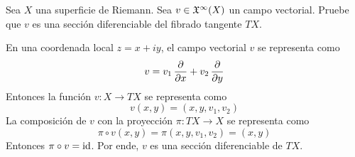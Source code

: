 \begin{exercise}
Sea $X$ una superficie de Riemann. Sea $v \in \mathfrak X^\infty(X)$ un campo vectorial. Pruebe que $v$ es una sección diferenciable del fibrado tangente $TX$.
\end{exercise}

\begin{solution}
En una coordenada local $z = x + iy$, el campo vectorial $v$ se representa como
$$v = v_1 \, \frac {\partial } {\partial x} + v_2 \, \frac {\partial } {\partial y}$$
Entonces la función $v : X \to TX$ se representa como
$$v(x,y) = (x, y, v_1, v_2)$$
La composición de $v$ con la proyección $\pi : TX \to X$ se representa como
$$\pi \circ v(x, y) = \pi(x, y, v_1, v_2) = (x, y)$$
Entonces $\pi \circ v = \operatorname{id}$. Por ende, $v$ es una sección diferenciable de $TX$.
\end{solution}
